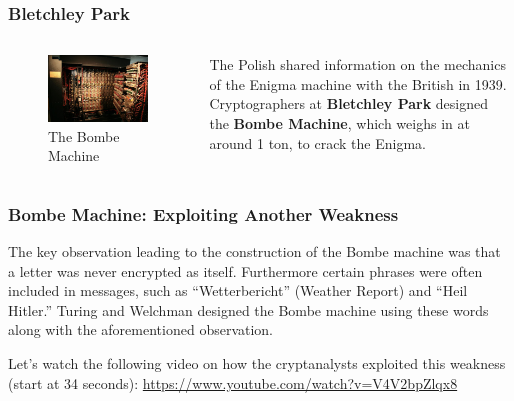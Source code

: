 \documentclass{beamer}
\newcommand{\<}{\langle}
\renewcommand{\>}{\rangle}
\begin{document}
\begin{frame}
\frametitle{Bletchley Park}

\begin{columns}
\begin{column}{.6\textwidth}
\begin{figure}
\includegraphics[scale=.25]{IMG/bombe}
\caption{\scriptsize The Bombe Machine}
\end{figure}
\end{column}
\begin{column}{.4\textwidth}
The Polish shared information on the mechanics of the Enigma machine with the British in 1939. Cryptographers at \textbf{Bletchley Park} designed the \textbf{Bombe Machine}, which weighs in at around 1 ton, to crack the Enigma.
\end{column}
\end{columns}
\end{frame}



\begin{frame}
\frametitle{Bombe Machine: Exploiting Another Weakness}

The key observation leading to the construction of the Bombe machine was that a letter was never encrypted as itself. Furthermore certain phrases were often included in messages, such as ``Wetterbericht'' (Weather Report) and ``Heil Hitler.'' Turing and Welchman designed the Bombe machine using these words along with the aforementioned observation. \newline

Let's watch the following video on how the cryptanalysts exploited this weakness (start at 34 seconds):
\url{https://www.youtube.com/watch?v=V4V2bpZlqx8}
\end{frame}
\end{document}
